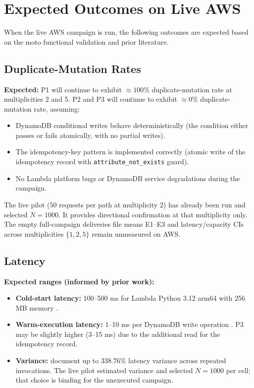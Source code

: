 \section{Expected Outcomes on Live AWS}
\label{sec:expected_live}

When the live AWS campaign is run, the following outcomes are expected based on the moto functional validation and prior literature.

\subsection{Duplicate-Mutation Rates}

\textbf{Expected:} P1 will continue to exhibit $\approx 100\%$ duplicate-mutation rate at multiplicities 2 and 5. P2 and P3 will continue to exhibit $\approx 0\%$ duplicate-mutation rate, assuming:

\begin{itemize}
    \item DynamoDB conditional writes behave deterministically (the condition either passes or fails atomically, with no partial writes).
    \item The idempotency-key pattern is implemented correctly (atomic write of the idempotency record with \texttt{attribute\_not\_exists} guard).
    \item No Lambda platform bugs or DynamoDB service degradations during the campaign.
\end{itemize}

The live pilot ($50$ requests per path at multiplicity 2) has already been run and selected $N=1000$. It provides directional confirmation at that multiplicity only. The empty full-campaign deliveries file means E1--E3 and latency/capacity CIs across multiplicities $\{1,2,5\}$ remain unmeasured on AWS.

\subsection{Latency}

\textbf{Expected ranges (informed by prior work):}

\begin{itemize}
    \item \textbf{Cold-start latency:} 100--500 ms for Lambda Python 3.12 arm64 with 256 MB memory \citep{Scheuner2022CrossFit, Liu2023FaaSLight}.
    \item \textbf{Warm-execution latency:} 1--10 ms per DynamoDB write operation \citep{Elhemali2022DynamoDB}. P3 may be slightly higher (3--15 ms) due to the additional read for the idempotency record.
    \item \textbf{Variance:} \citet{Wen2025Variance} document up to 338.76\% latency variance across repeated invocations. The live pilot estimated variance and selected $N = 1000$ per cell; that choice is binding for the unexecuted campaign.
\end{itemize}

